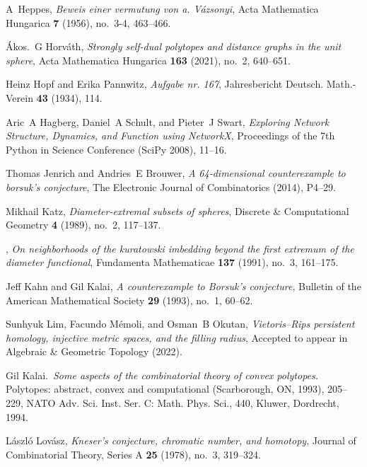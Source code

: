 \documentclass[12pt]{amsart}
\theoremstyle{plain}
\numberwithin{equation}{section}
\begin{document}
\begin{thebibliography}{Kat89}
	A~Heppes, \emph{Beweis einer vermutung von a. {V}{\'a}zsonyi}, Acta Mathematica
	  Hungarica \textbf{7} (1956), no.~3-4, 463--466.
	
	{\'A}kos.~G Horv{\'a}th, \emph{Strongly self-dual polytopes and distance graphs
	  in the unit sphere}, Acta Mathematica Hungarica \textbf{163} (2021), no.~2,
	  640--651.
	
	Heinz Hopf and Erika Pannwitz, \emph{Aufgabe nr. 167}, Jahresbericht Deutsch.
	  Math.-Verein \textbf{43} (1934), 114.
	
	Aric~A Hagberg, Daniel~A Schult, and Pieter~J Swart, \emph{Exploring {{Network
	  Structure}}, {{Dynamics}}, and {{Function}} using {{NetworkX}}}, Proceedings
	  of the 7th Python in Science Conference (SciPy 2008), 11--16.
	
	Thomas Jenrich and Andries~E Brouwer, \emph{A 64-dimensional counterexample to
		borsuk's conjecture}, The Electronic Journal of Combinatorics (2014), P4--29.

	Mikhail Katz, \emph{Diameter-extremal subsets of spheres}, Discrete \&
	Computational Geometry \textbf{4} (1989), no.~2, 117--137.

	\bysame, \emph{On neighborhoods of the kuratowski imbedding beyond the first
	extremum of the diameter functional}, Fundamenta Mathematicae \textbf{137}
	(1991), no.~3, 161--175.

	Jeff Kahn and Gil Kalai, \emph{A counterexample to {B}orsuk’s conjecture},
	  Bulletin of the American Mathematical Society \textbf{29} (1993), no.~1,
	  60--62.


	  Sunhyuk Lim, Facundo M{\'e}moli, and Osman~B Okutan, \emph{Vietoris--{R}ips
		persistent homology, injective metric spaces, and the filling radius},
		Accepted to appear in Algebraic \& Geometric Topology (2022).

	 Gil Kalai.\, \emph{Some aspects of the
	combinatorial theory of convex polytopes.}  Polytopes: abstract,
	convex and computational (Scarborough, ON, 1993), 205--229, NATO
	Adv. Sci. Inst. Ser. C: Math. Phys. Sci., 440, Kluwer, Dordrecht,
	1994.

	L{\'a}szl{\'o} Lov{\'a}sz, \emph{Kneser's conjecture, chromatic number, and
	  homotopy}, Journal of Combinatorial Theory, Series A \textbf{25} (1978),
	  no.~3, 319--324.
	

\end{thebibliography}
\end{document}

